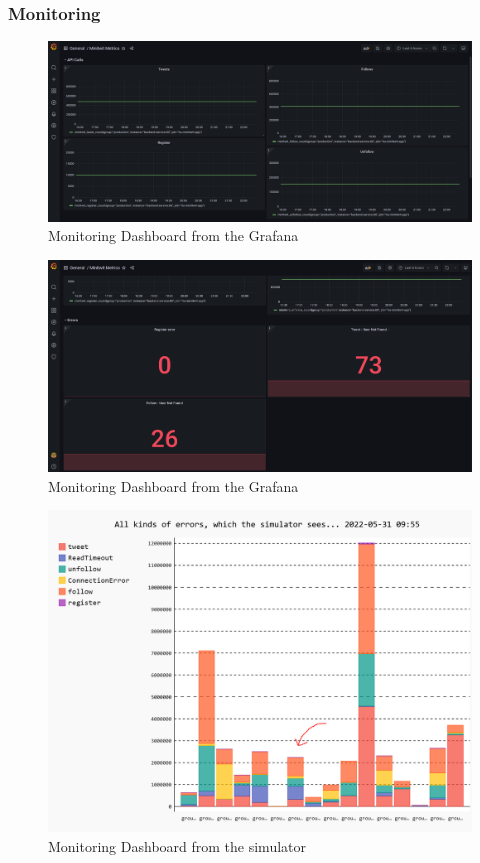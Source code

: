 \subsubsection{Monitoring}
\label{app:monitoring}
\begin {figure}[H]
    \centering
    \includegraphics[scale=0.42]{images/monitoring/monitoring1.PNG}
    \caption{Monitoring Dashboard from the Grafana}
    \label{fig:simMonitor}
\end{figure}
\begin {figure}[H]
    \centering
    \includegraphics[scale=0.42]{images/monitoring/monitoring2.PNG}
    \caption{Monitoring Dashboard from the Grafana}
    \label{fig:simMonitor}
\end{figure}

\begin {figure}[H]
    \centering
    \includegraphics[scale=0.42]{images/monitoring/SimulatorMonitor.PNG}
    \caption{Monitoring Dashboard from the simulator}
    \label{fig:simMonitor}
\end{figure}

